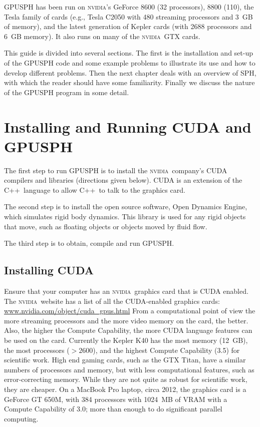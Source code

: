 \documentclass[12pt]{memoir}
\newcommand{\nvidia}{\textsc{nvidia}}
\newcommand{\cpp}{{\sffamily C\ttfamily++}}
\begin{document}
GPUSPH has been run on \nvidia's GeForce 8600 (32 processors), 8800
(110), the Tesla family of cards (e.g., Tesla C2050 with 480 streaming
processors and 3~GB of memory), and the latest generation of Kepler
cards (with 2688 processors and 6~GB memory). It also runs on many of
the \nvidia\ GTX cards.

This guide is divided into several sections. The first is the
installation and set-up of the GPUSPH code and some example problems to
illustrate its use and how to develop different problems. Then the
next chapter deals with an overview of SPH, with which the reader should
have some familiarity. Finally we discuss the nature of the GPUSPH
program in some detail.

\chapter{Installing and Running CUDA and GPUSPH}

The first step to run GPUSPH is to install the \nvidia\ company's CUDA
compilers and libraries (directions given below). CUDA is an extension
of the \cpp\ language to allow \cpp\ to talk to the graphics card.

The second step is to install the open source software, Open Dynamics
Engine, which simulates rigid body dynamics. This library is used for
any rigid objects that move, such as floating objects or objects moved
by fluid flow.

The third step is to obtain, compile and run GPUSPH.

\section{Installing CUDA}

Ensure that your computer has an \nvidia\ graphics card that is CUDA
enabled. The \nvidia\ website has a list of all the CUDA-enabled graphics
cards: \url{www.nvidia.com/object/cuda_gpus.html} From a computational
point of view the more streaming processors and the more video memory on
the card, the better. Also, the higher the Compute Capability, the more
CUDA language features can be used on the card. Currently the Kepler
K40 has the most memory (12~GB), the most processors (${}>2600$), and
the highest Compute Capability (3.5) for scientific work. High end
gaming cards, such as the GTX Titan, have a similar numbers of
processors and memory, but with less computational features, such as
error-correcting memory. While they are not quite as robust for
scientific work, they are cheaper. On a MacBook Pro laptop, circa 2012,
the graphics card is a GeForce GT 650M, with 384 processors with 1024~MB
of VRAM with a Compute Capability of 3.0; more than enough to do
significant parallel computing.
\end{document}
